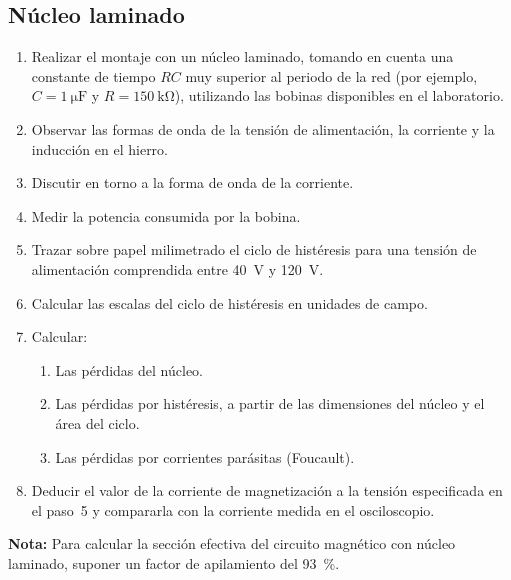 \subsection{Núcleo laminado}
\begin{enumerate}
    \item Realizar el montaje con un núcleo laminado, tomando en cuenta una constante de tiempo $RC$ muy superior al periodo de la red (por ejemplo, $C = \SI{1}{\micro\farad}$ y $R = \SI{150}{\kilo\ohm}$), utilizando las bobinas disponibles en el laboratorio.
    \item Observar las formas de onda de la tensión de alimentación, la corriente y la inducción en el hierro.
    \item Discutir en torno a la forma de onda de la corriente.
    \item Medir la potencia consumida por la bobina.
    \item Trazar sobre papel milimetrado el ciclo de histéresis para una tensión de alimentación comprendida entre \SI{40}{V} y \SI{120}{V}.
    \item Calcular las escalas del ciclo de histéresis en unidades de campo.
    \item Calcular:
          \begin{enumerate}
              \item Las pérdidas del núcleo.
              \item Las pérdidas por histéresis, a partir de las dimensiones del núcleo y el área del ciclo.
              \item Las pérdidas por corrientes parásitas (Foucault).
          \end{enumerate}
    \item Deducir el valor de la corriente de magnetización a la tensión especificada en el paso~5 y compararla con la corriente medida en el osciloscopio.
\end{enumerate}

\begin{center}
    \textbf{Nota:} Para calcular la sección efectiva del circuito magnético con núcleo laminado, suponer un factor de apilamiento del \SI{93}{\percent}.
\end{center}
